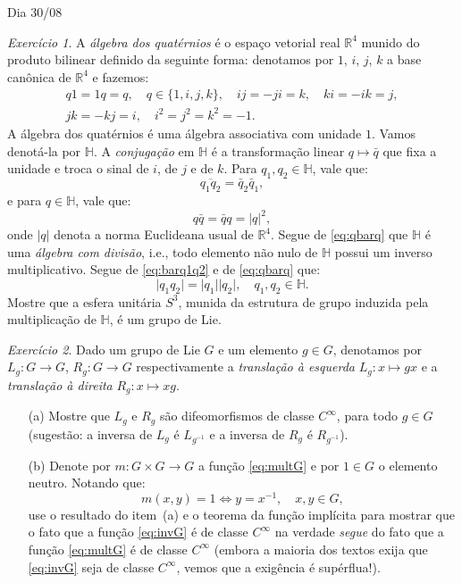 \documentclass[oneside,11pt]{amsart}
\newcommand{\R}{\mathds R}
\newcommand{\IH}{\mathds H}
\theoremstyle{remark}\newtheorem{exercise}{Exercício}[section]
\theoremstyle{plain}\newtheorem{teo}{Teorema}[section]
\theoremstyle{plain}\newtheorem{lem}[teo]{Lema}
\theoremstyle{plain}\newtheorem{prop}[teo]{Proposição}
\theoremstyle{definition}\newtheorem{defin}[teo]{Definição}
\theoremstyle{remark}\newtheorem{rem}[teo]{Observação}
\theoremstyle{definition}\newtheorem{example}[teo]{Exemplo}
\numberwithin{equation}{section}
\begin{document}
\begin{section}{Dia 30/08}
\begin{exercise}\label{exe:quaternios}
A {\em álgebra dos quatérnios\/}
é o espaço vetorial real $\R^4$ munido do produto bilinear definido da seguinte forma: denotamos por $1$, $i$, $j$, $k$
a base canônica de $\R^4$ e fazemos:
\begin{gather*}
q1=1q=q,\quad q\in\{1,i,j,k\},\quad ij=-ji=k,\quad ki=-ik=j,\\
jk=-kj=i,\quad i^2=j^2=k^2=-1.
\end{gather*}
A álgebra dos quatérnios é uma álgebra associativa com unidade $1$. Vamos denotá-la por $\IH$. A {\em conjugação\/}
em $\IH$ é a transformação linear $q\mapsto\bar q$ que fixa a unidade e troca o sinal de $i$, de $j$ e de $k$. Para $q_1,q_2\in\IH$, vale que:
\begin{equation}\label{eq:barq1q2}
\overline{q_1q_2}=\bar q_2\bar q_1,
\end{equation}
e para $q\in\IH$, vale que:
\begin{equation}\label{eq:qbarq}
q\bar q=\bar qq=\vert q\vert^2,
\end{equation}
onde $\vert q\vert$ denota a norma Euclideana usual de $\R^4$. Segue de \eqref{eq:qbarq} que $\IH$ é uma {\em álgebra com divisão},
i.e., todo elemento não nulo de $\IH$ possui um inverso multiplicativo. Segue de \eqref{eq:barq1q2} e de \eqref{eq:qbarq} que:
\[\vert q_1q_2\vert=\vert q_1\vert\vert q_2\vert,\quad q_1,q_2\in\IH.\]
Mostre que a esfera unitária $S^3$,
munida da estrutura de grupo induzida pela multiplicação de $\IH$, é um grupo de Lie.
\end{exercise}

\begin{exercise}
Dado um grupo de Lie $G$ e um elemento $g\in G$, denotamos por $L_g:G\to G$, $R_g:G\to G$ respectivamente a
{\em translação à esquerda\/} $L_g:x\mapsto gx$ e a {\em translação à direita\/} $R_g:x\mapsto xg$.
\begin{itemize}
\item[(a)] Mostre que $L_g$ e $R_g$ são difeomorfismos de classe $C^\infty$, para todo $g\in G$ (sugestão:
a inversa de $L_g$ é $L_{g^{-1}}$ e a inversa de $R_g$ é $R_{g^{-1}}$).
\item[(b)] Denote por $m:G\times G\to G$ a função \eqref{eq:multG} e por $1\in G$ o elemento neutro. Notando que:
\[m(x,y)=1\Longleftrightarrow y=x^{-1},\quad x,y\in G,\]
use o resultado do item~(a) e o teorema da função implícita para mostrar que o fato que a função \eqref{eq:invG}
é de classe $C^\infty$ na verdade {\em segue\/} do fato que a função \eqref{eq:multG} é de classe $C^\infty$
(embora a maioria dos textos exija que \eqref{eq:invG} seja de classe $C^\infty$, vemos que a exigência
é supérflua!).
\end{itemize}
\end{exercise}


\end{section}
\end{document}
